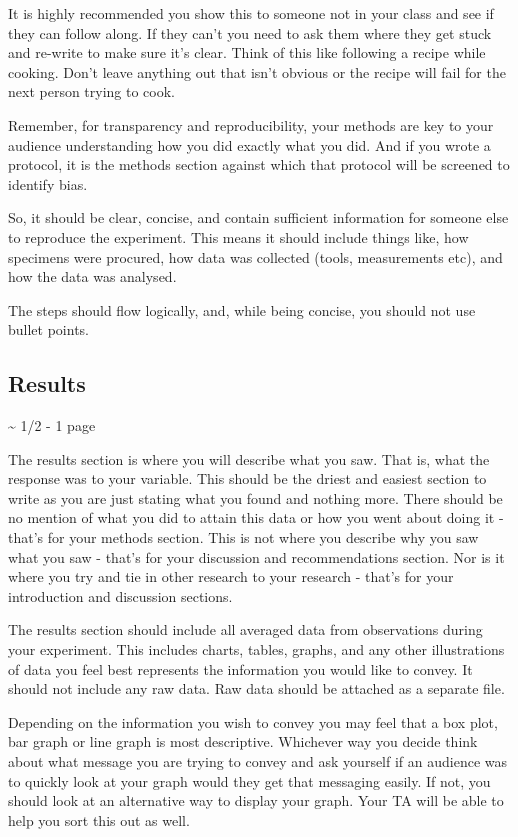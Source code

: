 \documentclass[
]{book}
\begin{document}
It is highly recommended you show this to someone not in your class and see if they can follow along. If they can't you need to ask them where they get stuck and re-write to make sure it's clear. Think of this like following a recipe while cooking. Don't leave anything out that isn't obvious or the recipe will fail for the next person trying to cook.

Remember, for transparency and reproducibility, your methods are key to your audience understanding how you did exactly what you did. And if you wrote a protocol, it is the methods section against which that protocol will be screened to identify bias.

So, it should be clear, concise, and contain sufficient information for someone else to reproduce the experiment. This means it should include things like, how specimens were procured, how data was collected (tools, measurements etc), and how the data was analysed.

The steps should flow logically, and, while being concise, you should not use bullet points.

\hypertarget{results}{%
\subsection*{Results}\label{results}}

\textasciitilde{} 1/2 - 1 page

The results section is where you will describe what you saw. That is, what the response was to your variable. This should be the driest and easiest section to write as you are just stating what you found and nothing more. There should be no mention of what you did to attain this data or how you went about doing it - that's for your methods section. This is not where you describe why you saw what you saw - that's for your discussion and recommendations section. Nor is it where you try and tie in other research to your research - that's for your introduction and discussion sections.

The results section should include all averaged data from observations during your experiment. This includes charts, tables, graphs, and any other illustrations of data you feel best represents the information you would like to convey. It should not include any raw data. Raw data should be attached as a separate file.

Depending on the information you wish to convey you may feel that a box plot, bar graph or line graph is most descriptive. Whichever way you decide think about what message you are trying to convey and ask yourself if an audience was to quickly look at your graph would they get that messaging easily. If not, you should look at an alternative way to display your graph. Your TA will be able to help you sort this out as well.
\end{document}
